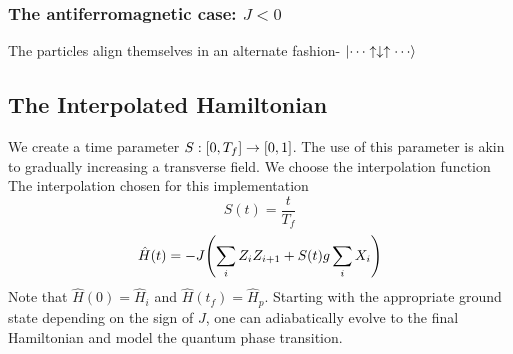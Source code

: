 \documentclass{article}
\begin{document}
\subsubsection{The antiferromagnetic case: $J<0$}
The particles align themselves in an alternate fashion- $\ket{\cdots \uparrow\downarrow\uparrow \cdots}$
 
\subsection{The Interpolated Hamiltonian}
We create a time parameter $S: \bqty{0, T_f}\to \bqty{0,1}$. The use of this parameter is akin to gradually increasing a transverse field. We choose the interpolation function 
The interpolation chosen for this implementation $$S(t) = \frac{t}{T_f}$$
$$\hat H(t) = -J \pqty{\sum_{i}Z_{i}Z_{i+1} + S(t)g\sum_i X_i} $$
Note that $\hat H(0) = \hat H_i$ and $\hat H(t_f) = \hat H_p$. Starting with the appropriate ground state depending on the sign of $J$, one can adiabatically evolve to the final Hamiltonian and model the quantum phase transition. 
 
\end{document}
